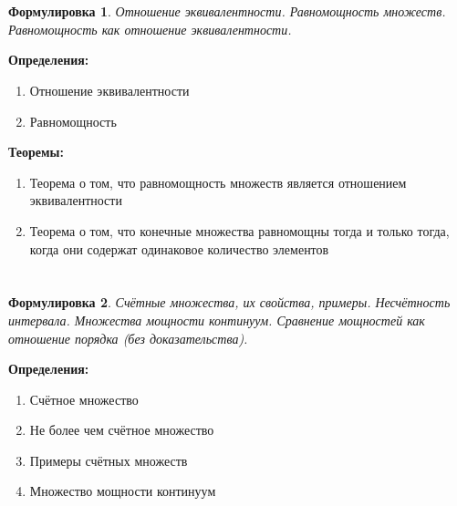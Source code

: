\documentclass[a4paper]{article}
\theoremstyle{plain}
\newtheorem*{st}{Формулировка}
\theoremstyle{definition}
\theoremstyle{remark}
\begin{document}
\section{}
\begin{st}
    Отношение эквивалентности. Равномощность множеств. Равномощность как отношение эквивалентности.
\end{st}

\textbf{Определения:}
\begin{enumerate}
    \item Отношение эквивалентности
    \item Равномощность
\end{enumerate}

\textbf{Теоремы:}
\begin{enumerate}
    \item Теорема о том, что равномощность множеств является отношением эквивалентности
    \item Теорема о том, что конечные множества равномощны тогда и только тогда, когда они содержат одинаковое количество элементов
\end{enumerate}


\section{}
\begin{st}
    Счётные множества, их свойства, примеры. Несчётность интервала. Множества мощности континуум. Сравнение мощностей как отношение порядка (без доказательства).
\end{st}

\textbf{Определения:}
\begin{enumerate}
    \item Счётное множество
    \item Не более чем счётное множество
    \item Примеры счётных множеств
    \item Множество мощности континуум
\end{enumerate}
\end{document}
